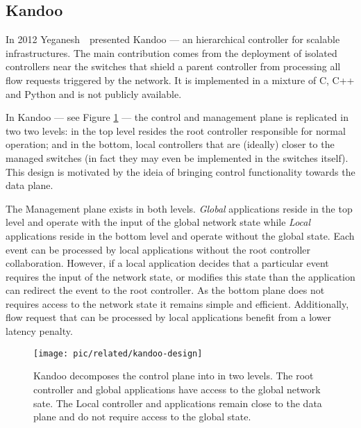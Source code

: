 \subsection{Kandoo}
\label{sec:related:kandoo}

In 2012 Yeganesh~\etal\ presented Kandoo \cite{Yeganeh:2012jm}  --- an hierarchical controller for scalable infrastructures. 
The main contribution comes from the deployment of isolated controllers near the switches that shield a parent  controller from processing all
flow requests triggered by the network. 
It is implemented in a mixture of
C, C++ and Python and is not publicly available. 

In Kandoo --- see Figure  \ref{fig:kandoo-design} --- the control and management plane is replicated in two two levels: in the top level resides the root controller responsible for normal operation; and in the bottom, local controllers that are (ideally) closer to the managed switches (in fact they may even be implemented in the switches itself). 
This design is motivated by the ideia of bringing control functionality towards the data plane. 


The Management plane exists in both levels. 
\emph{Global} applications reside in the top level and operate with the input of the global network state while \emph{Local} applications reside in the bottom level and operate without the global state. 
Each event can be processed by local applications without the root controller collaboration. 
However, if a local application decides that a particular event requires the input of the network state, or modifies this state than the application can redirect the event to the root controller. 
As the bottom plane does not requires access to the network state it remains simple and efficient. 
Additionally, flow request that can be processed by local applications benefit from a lower latency penalty. 


\begin{figure}
  \centering 
\texttt{[image: pic/related/kandoo-design]}
  \caption[Kandoo design] {Kandoo decomposes the control plane into 
in two levels. The root controller and global applications have access to the global network sate.  The Local controller and applications remain close to the data plane and do not require access to the global state.} 
  \label{fig:kandoo-design}
\end{figure}



